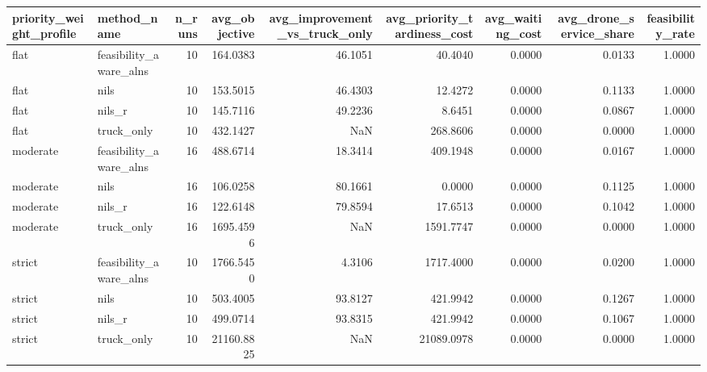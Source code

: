 \begin{tabular}{llrrrrrrr}
\toprule
priority_weight_profile & method_name & n_runs & avg_objective & avg_improvement_vs_truck_only & avg_priority_tardiness_cost & avg_waiting_cost & avg_drone_service_share & feasibility_rate \\
\midrule
flat & feasibility_aware_alns & 10 & 164.0383 & 46.1051 & 40.4040 & 0.0000 & 0.0133 & 1.0000 \\
flat & nils & 10 & 153.5015 & 46.4303 & 12.4272 & 0.0000 & 0.1133 & 1.0000 \\
flat & nils_r & 10 & 145.7116 & 49.2236 & 8.6451 & 0.0000 & 0.0867 & 1.0000 \\
flat & truck_only & 10 & 432.1427 & NaN & 268.8606 & 0.0000 & 0.0000 & 1.0000 \\
moderate & feasibility_aware_alns & 16 & 488.6714 & 18.3414 & 409.1948 & 0.0000 & 0.0167 & 1.0000 \\
moderate & nils & 16 & 106.0258 & 80.1661 & 0.0000 & 0.0000 & 0.1125 & 1.0000 \\
moderate & nils_r & 16 & 122.6148 & 79.8594 & 17.6513 & 0.0000 & 0.1042 & 1.0000 \\
moderate & truck_only & 16 & 1695.4596 & NaN & 1591.7747 & 0.0000 & 0.0000 & 1.0000 \\
strict & feasibility_aware_alns & 10 & 1766.5450 & 4.3106 & 1717.4000 & 0.0000 & 0.0200 & 1.0000 \\
strict & nils & 10 & 503.4005 & 93.8127 & 421.9942 & 0.0000 & 0.1267 & 1.0000 \\
strict & nils_r & 10 & 499.0714 & 93.8315 & 421.9942 & 0.0000 & 0.1067 & 1.0000 \\
strict & truck_only & 10 & 21160.8825 & NaN & 21089.0978 & 0.0000 & 0.0000 & 1.0000 \\
\bottomrule
\end{tabular}

